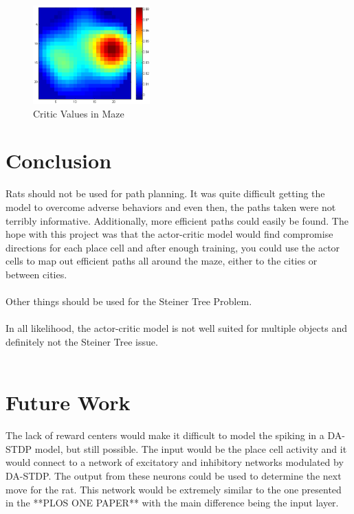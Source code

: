 \documentclass[conference]{IEEEtran}
\begin{document}
\begin{figure}
\includegraphics[width=0.4\textwidth]{waterMazeRevisedD_Critic_populationRewards.png} 
\caption{Critic Values in Maze}
\end{figure}

\section{Conclusion}
Rats should not be used for path planning. It was quite difficult getting the model to overcome adverse behaviors and even then, the paths taken were not terribly informative. Additionally, more efficient paths could easily be found. The hope with this project was that the actor-critic model would find compromise directions for each place cell and after enough training, you could use the actor cells to map out efficient paths all around the maze, either to the cities or between cities. \\
\\
Other things should be used for the Steiner Tree Problem. \\
\\
In all likelihood, the actor-critic model is not well suited for multiple objects and definitely not the Steiner Tree issue. \\
\\

\section{Future Work}

The lack of reward centers would make it difficult to model the spiking in a DA-STDP model, but still possible. The input would be the place cell activity and it would connect to a network of excitatory and inhibitory networks modulated by DA-STDP. The output from these neurons could be used to determine the next move for the rat. This network would be extremely similar to the one presented in the **PLOS ONE PAPER** with the main difference being the input layer. 





\end{document}
